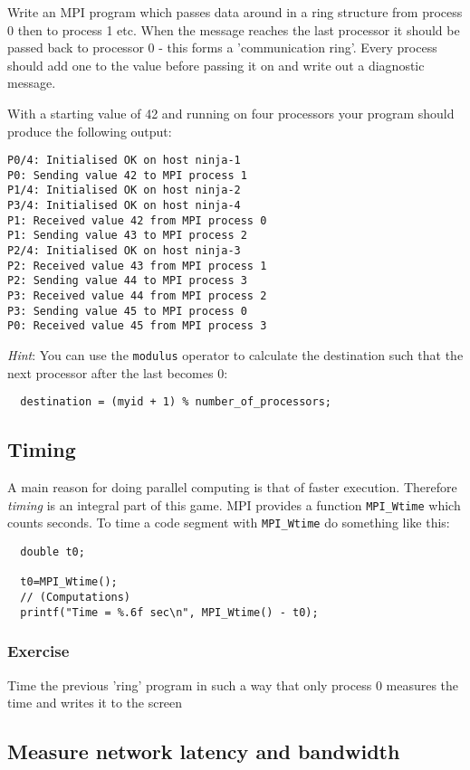 \documentclass[12pt]{article}
\begin{document}
Write an MPI program which passes data
around in a ring structure from process 0 then to process 1 etc.
When the message reaches the last processor it should be passed back to
processor 0 - this forms a 'communication ring'.
Every process should add one to the value before passing it on
and write out a diagnostic message.

With a starting value of 42 and running on four processors your program
should produce the following output:
\begin{verbatim}
P0/4: Initialised OK on host ninja-1
P0: Sending value 42 to MPI process 1
P1/4: Initialised OK on host ninja-2
P3/4: Initialised OK on host ninja-4
P1: Received value 42 from MPI process 0
P1: Sending value 43 to MPI process 2
P2/4: Initialised OK on host ninja-3
P2: Received value 43 from MPI process 1
P2: Sending value 44 to MPI process 3
P3: Received value 44 from MPI process 2
P3: Sending value 45 to MPI process 0
P0: Received value 45 from MPI process 3
\end{verbatim}
\emph{Hint}: You can use the \texttt{modulus} operator to calculate
the destination such that the next processor after the last becomes 0:
\begin{verbatim}
  destination = (myid + 1) % number_of_processors;
\end{verbatim}


\subsection*{Timing}
A main reason for doing parallel computing is that of faster execution.
Therefore \emph{timing} is an integral part of this game.
MPI provides a function \texttt{MPI\_Wtime} which counts seconds.
To time a code segment with \texttt{MPI\_Wtime} do something like this:
\begin{verbatim}
  double t0;

  t0=MPI_Wtime();
  // (Computations)
  printf("Time = %.6f sec\n", MPI_Wtime() - t0);
\end{verbatim}

\subsubsection*{Exercise}
Time the previous 'ring' program in such a way that only process 0
measures the time and writes it to the screen


\subsection*{Measure network latency and bandwidth}
\end{document}
